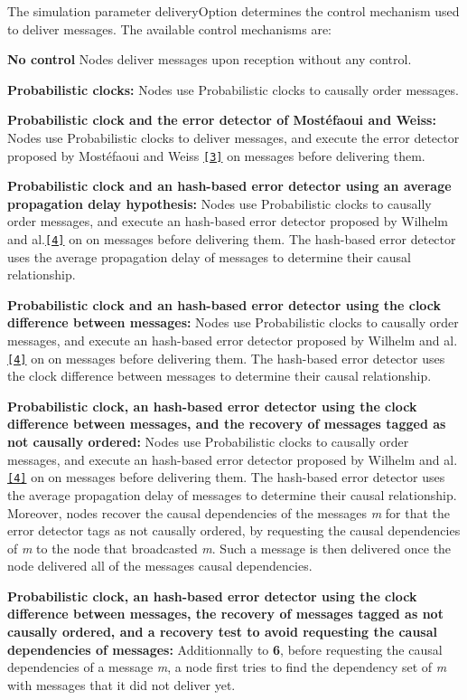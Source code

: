 The simulation parameter \textquotesingle{}delivery\+Option\textquotesingle{} determines the control mechanism used to deliver messages. The available control mechanisms are\+:
\begin{DoxyEnumerate}
\item {\bfseries No control} Nodes deliver messages upon reception without any control.
\item {\bfseries Probabilistic clocks\+:} Nodes use Probabilistic clocks to causally order messages.
\item {\bfseries Probabilistic clock and the error detector of Mostéfaoui and Weiss\+:} Nodes use Probabilistic clocks to deliver messages, and execute the error detector proposed by Mostéfaoui and Weiss \href{https://hal.science/hal-02056349/document}{\tt \mbox{[}3\mbox{]}} on messages before delivering them.
\item {\bfseries Probabilistic clock and an hash-\/based error detector using an average propagation delay hypothesis\+:} Nodes use Probabilistic clocks to causally order messages, and execute an hash-\/based error detector proposed by Wilhelm and al.\href{https://hal.science/hal-03984499}{\tt \mbox{[}4\mbox{]}} on on messages before delivering them. The hash-\/based error detector uses the average propagation delay of messages to determine their causal relationship.
\item {\bfseries Probabilistic clock and an hash-\/based error detector using the clock difference between messages\+:} Nodes use Probabilistic clocks to causally order messages, and execute an hash-\/based error detector proposed by Wilhelm and al.\href{https://hal.science/hal-03984499}{\tt \mbox{[}4\mbox{]}} on on messages before delivering them. The hash-\/based error detector uses the clock difference between messages to determine their causal relationship.
\item {\bfseries Probabilistic clock, an hash-\/based error detector using the clock difference between messages, and the recovery of messages tagged as not causally ordered\+:} Nodes use Probabilistic clocks to causally order messages, and execute an hash-\/based error detector proposed by Wilhelm and al.\href{https://hal.science/hal-03984499}{\tt \mbox{[}4\mbox{]}} on on messages before delivering them. The hash-\/based error detector uses the average propagation delay of messages to determine their causal relationship. Moreover, nodes recover the causal dependencies of the messages {\itshape m} for that the error detector tags as not causally ordered, by requesting the causal dependencies of {\itshape m} to the node that broadcasted {\itshape m}. Such a message is then delivered once the node delivered all of the message\textquotesingle{}s causal dependencies.
\item {\bfseries Probabilistic clock, an hash-\/based error detector using the clock difference between messages, the recovery of messages tagged as not causally ordered, and a recovery test to avoid requesting the causal dependencies of messages\+:} Additionnally to {\bfseries 6}, before requesting the causal dependencies of a message {\itshape m}, a node first tries to find the dependency set of {\itshape m} with messages that it did not deliver yet.
\end{DoxyEnumerate}

